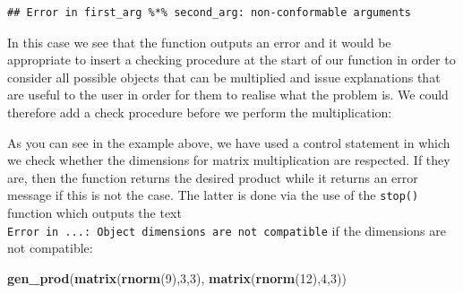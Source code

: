 \documentclass[12pt,]{krantz}
\newenvironment{Shaded}{\begin{snugshade}}{\end{snugshade}}
\newcommand{\KeywordTok}[1]{\textcolor[rgb]{0.27,0.27,0.27}{\textbf{#1}}}
\newcommand{\DataTypeTok}[1]{\textcolor[rgb]{0.27,0.27,0.27}{#1}}
\newcommand{\DecValTok}[1]{\textcolor[rgb]{0.06,0.06,0.06}{#1}}
\newcommand{\StringTok}[1]{\textcolor[rgb]{0.5,0.5,0.5}{#1}}
\newcommand{\ControlFlowTok}[1]{\textcolor[rgb]{0.27,0.27,0.27}{\textbf{#1}}}
\newcommand{\OperatorTok}[1]{\textcolor[rgb]{0.43,0.43,0.43}{\textbf{#1}}}
\newcommand{\NormalTok}[1]{#1}
\begin{document}
\begin{verbatim}
## Error in first_arg %*% second_arg: non-conformable arguments
\end{verbatim}

In this case we see that the function outputs an error and it would be
appropriate to insert a checking procedure at the start of our function
in order to consider all possible objects that can be multiplied and
issue explanations that are useful to the user in order for them to
realise what the problem is. We could therefore add a check procedure
before we perform the multiplication:

\begin{Shaded}
\end{Shaded}

As you can see in the example above, we have used a control statement in
which we check whether the dimensions for matrix multiplication are
respected. If they are, then the function returns the desired product
while it returns an error message if this is not the case. The latter is
done via the use of the \texttt{stop()} function which outputs the text
\texttt{Error\ in\ ...:\ Object\ dimensions\ are\ not\ compatible} if
the dimensions are not compatible:

\begin{Shaded}
\begin{Highlighting}[]
\KeywordTok{gen_prod}\NormalTok{(}\KeywordTok{matrix}\NormalTok{(}\KeywordTok{rnorm}\NormalTok{(}\DecValTok{9}\NormalTok{),}\DecValTok{3}\NormalTok{,}\DecValTok{3}\NormalTok{), }\KeywordTok{matrix}\NormalTok{(}\KeywordTok{rnorm}\NormalTok{(}\DecValTok{12}\NormalTok{),}\DecValTok{4}\NormalTok{,}\DecValTok{3}\NormalTok{))}
\end{Highlighting}
\end{Shaded}
\end{document}
